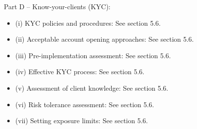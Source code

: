 \documentclass[]{report}
\begin{document}
\begin{itemize}
Part D – Know-your-clients (KYC):
\begin{itemize}
\item (i) KYC policies and procedures: See section 5.6.
\item (ii) Acceptable account opening approaches: See section 5.6.
\item (iii) Pre-implementation assessment: See section 5.6.
\item (iv) Effective KYC process: See section 5.6.
\item (v) Assessment of client knowledge: See section 5.6.
\item (vi) Risk tolerance assessment: See section 5.6.
\item (vii) Setting exposure limits: See section 5.6.
\end{itemize}


\end{itemize}
\end{document}
